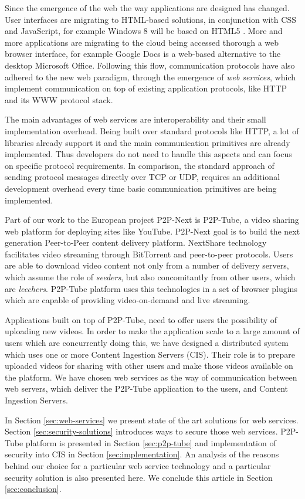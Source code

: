 Since the emergence of the web the way applications are designed has changed. User interfaces are migrating to HTML-based solutions, in conjunction with CSS and JavaScript, for example Windows 8 will be based on HTML5 \cite{win8-html5}. More and more applications are migrating to the cloud being accessed thorough a web browser interface, for example Google Docs is a web-based alternative to the desktop Microsoft Office. Following this flow, communication protocols have also adhered to the new web paradigm, through the emergence of \textit{web services}, which implement communication on top of existing application protocols, like HTTP and its WWW protocol stack.

The main advantages of web services are interoperability and their small implementation overhead. Being built over standard protocols like HTTP, a lot of libraries already support it and the main communication primitives are already implemented. Thus developers do not need to handle this aspects and can focus on specific protocol requirements. In comparison, the standard approach of sending protocol messages directly over TCP or UDP, requires an additional development overhead every time basic communication primitives are being implemented.

Part of our work to the European project P2P-Next \cite{p2p-next} is P2P-Tube, a video sharing web platform for deploying sites like YouTube. P2P-Next goal is to build the next generation Peer-to-Peer content delivery platform. NextShare technology facilitates video streaming through BitTorrent and peer-to-peer protocols. Users are able to download video content not only from a number of delivery servers, which assume the role of \textit{seeders}, but also concomitantly from other users, which are \textit{leechers}. P2P-Tube platform uses this technologies in a set of browser plugins which are capable of providing video-on-demand and live streaming.

Applications built on top of P2P-Tube, need to offer users the possibility of uploading new videos. In order to make the application scale to a large amount of users which are concurrently doing this, we have designed a distributed system which uses one or more Content Ingestion Servers (CIS). Their role is to prepare uploaded videos for sharing with other users and make those videos available on the platform. We have chosen web services as the way of communication between web servers, which deliver the P2P-Tube application to the users, and Content Ingestion Servers.

In Section \ref{sec:web-services} we present state of the art solutions for web services. Section \ref{sec:security-solutions} introduces ways to secure those web services. P2P-Tube platform is presented in Section \ref{sec:p2p-tube} and implementation of security into CIS in Section \ref{sec:implementation}. An analysis of the reasons behind our choice for a particular web service technology and a particular security solution is also presented here. We conclude this article in Section \ref{sec:conclusion}.
